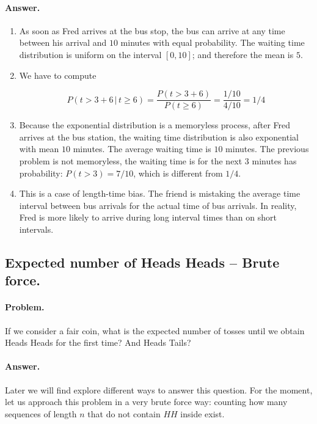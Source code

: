 \documentclass[12pt]{article}
\begin{document}
\paragraph{Answer.}
\begin{enumerate}
\item As soon as Fred arrives at the bus stop, 
the bus can arrive at any time between his arrival and $10$ minutes with
equal probability. The waiting time distribution is uniform on the interval $[0,10]$;
and therefore the mean is $5$.

\item We have to compute

\begin{equation}
P( t > 3 + 6 \,|\, t \geq 6 ) = 
\frac{ P( t > 3 + 6 ) }{ P( t \geq 6 ) } =
\frac{1/10}{4/10} = 
1 / 4
\end{equation}

\item Because the exponential distribution is a memoryless process, after Fred arrives at the bus 
station, the waiting time distribution is also exponential with mean $10$ minutes.
The average waiting time is $10$ minutes.
The previous problem is not memoryless, the waiting time is for the next $3$ minutes has probability:
$P( t > 3 ) = 7/10$, which is different from $1/4$.

\item This is a case of length-time bias. The friend is mistaking the average time interval between
bus arrivals for the actual time of bus arrivals.
In reality, Fred is more likely to arrive during long interval times than on short intervals.
\end{enumerate}

\subsection{Expected number of Heads Heads -- Brute force.}

\paragraph{Problem.}
If we consider a fair coin, what is the expected number of tosses
until we obtain Heads Heads for the first time? And Heads Tails?

\paragraph{Answer.}
Later we will find explore different ways to answer this question.
For the moment, let us approach this problem in a very brute force way:
counting how many sequences of length $n$ that do not contain $HH$ inside
exist.
\end{document}
